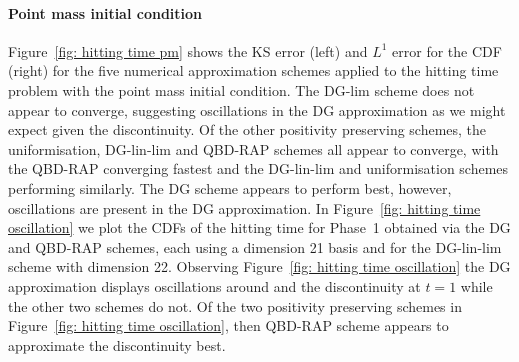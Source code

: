 \paragraph{Point mass initial condition}
Figure~\ref{fig: hitting time pm} shows the KS error (left) and \(L^1\) error for the CDF (right) for the five numerical approximation schemes applied to the hitting time problem with the point mass initial condition. The DG-lim scheme does not appear to converge, suggesting oscillations in the DG approximation as we might expect given the discontinuity. Of the other positivity preserving schemes, the uniformisation, DG-lin-lim and QBD-RAP schemes all appear to converge, with the QBD-RAP converging fastest and the DG-lin-lim and uniformisation schemes performing similarly. The DG scheme appears to perform best, however, oscillations are present in the DG approximation. In Figure~\ref{fig: hitting time oscillation} we plot the CDFs of the hitting time for Phase~1 obtained via the DG and QBD-RAP schemes, each using a dimension 21 basis and for the DG-lin-lim scheme with dimension 22. Observing Figure~\ref{fig: hitting time oscillation} the DG approximation displays oscillations around and the discontinuity at \(t=1\) while the other two schemes do not. Of the two positivity preserving schemes in Figure~\ref{fig: hitting time oscillation}, then QBD-RAP scheme appears to approximate the discontinuity best. 
